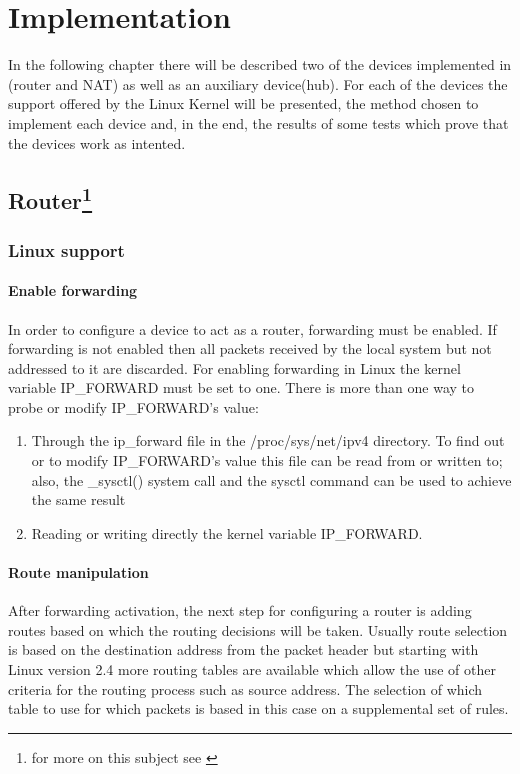 \chapter{Implementation}
\label{chapter:impl}
In the following chapter there will be described two of the devices implemented in \project(router and NAT) as well as an auxiliary device(hub). For each of the devices the support offered by the Linux Kernel will be presented, the method chosen to implement each device and, in the end, the results of some tests which prove that the devices work as intented.

\section[Router]{Router\footnote{for more on this subject see \cite{linnetarch}}}
\label{sec:router-impl}

\subsection{Linux support}
\label{sub-sec:router-linux}

\subsubsection{Enable forwarding}
In order to configure a device to act as a router, forwarding must be enabled. If forwarding is not enabled then all packets received by the local system but not addressed to it are discarded. 
For enabling forwarding in Linux the kernel variable IP_FORWARD must be set to one. There is more than one way to probe or modify IP_FORWARD's value:
\renewcommand{\theenumi}{\alph{enumi}}
\begin{enumerate}
\item Through the ip_forward file in the /proc/sys/net/ipv4 directory. To find out or to modify IP_FORWARD's value this file can be read from or written to; also, the _sysctl() system call and the sysctl command can be used to achieve the same result 
\item Reading or writing directly the kernel variable IP_FORWARD. 
\end{enumerate}
\renewcommand{\theenumi}{\arabic{enumi}}

\subsubsection{Route manipulation}
After forwarding activation, the next step for configuring a router is adding routes based on which the routing decisions will be taken. Usually route selection is based on the destination address from the packet header but starting with Linux version 2.4 more routing tables are available which allow the use of other criteria for the routing process such as source address. The selection of which table to use for which packets is based in this case on a supplemental set of rules.


